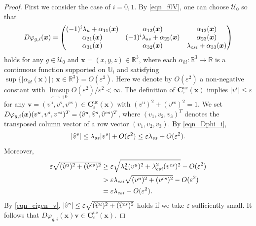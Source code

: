 \documentclass[10pt,a4paper]{amsart}
\def\bv{{\boldsymbol{v}}}
\def\bx{{\boldsymbol{x}}}
\begin{document}
\begin{proof}
First we consider the case of $i=0,1$.
By \eqref{eqn_f0V}, one can choose $\mathcal{U}_0$ so that 
\begin{equation}\label{eqn_Dphi_i}
D\varphi_{g,i}(\bx)=
\begin{pmatrix} (-1)^i\lambda_{\rm u}+\alpha_{11}(\bx)& \alpha_{12}(\bx)& \alpha_{13}(\bx)\\
\alpha_{21}(\bx)&(-1)^i \lambda_{\rm ss}+\alpha_{22}(\bx)& \alpha_{23}(\bx)\\
\alpha_{31}(\bx)& \alpha_{32}(\bx) &\lambda_{{\rm cs}i}+\alpha_{33}(\bx)
\end{pmatrix}
\end{equation}
holds for any $g\in\mathcal{U}_0$ and $\bx=(x,y,z)\in \mathbb{R}^3$,  
where each $\alpha_{kl}:\mathbb{R}^3\longrightarrow \mathbb{R}$ is a continuous function supported on $\mathbb{U}_i$ and satisfying  
$\sup\bigl\{|\alpha_{kl}(\bx)|\, ;\, \bx \in \mathbb{R}^3\bigr\}=O(\varepsilon^2)$.
Here we denote by $O(\varepsilon^2)$ a non-negative constant with $\limsup\limits_{\varepsilon\to +0}
O(\varepsilon^2)/\varepsilon^2<\infty$.
The definition of $\boldsymbol{C}_{\varepsilon}^{\mathrm{uc}}(\boldsymbol{x})$ 
implies $|v^{\mathrm{s}}|\leq \varepsilon$ for any $\bv=(v^{\mathrm{u}},v^{\mathrm{s}},v^{\mathrm{cs}})\in 
\boldsymbol{C}_{\varepsilon}^{\mathrm{uc}}(\boldsymbol{x})$ with 
$(v^{\mathrm{u}})^2+(v^{\mathrm{cs}})^2=1$.
We set $D\varphi_{g,i}(\bx)(v^{\rm u},v^{\rm s},v^{\rm cs})^T
=(\widehat{v}^{\rm u},\widehat{v}^{\rm s},\widehat{v}^{\rm cs})^T$, 
where $(v_1,v_2,v_3)^T$ denotes the transposed column vector of a row vector $(v_1,v_2,v_3)$.
By \eqref{eqn_Dphi_i}, 
\[
|\widehat{v}^{\rm s}|\leq \lambda_{\rm ss}|v^{\rm s}|+O(\varepsilon^2)
\leq \varepsilon\lambda_{\rm ss}+O(\varepsilon^2).
\]
Moreover, 
\begin{align*}
\varepsilon\sqrt{(\widehat{v}^{\rm u})^2+(\widehat{v}^{\rm cs})^2}
&\geq 
\varepsilon\sqrt{\lambda_{\rm u}^2(v^{\rm u})^2+\lambda_{{\rm cs}i}^2(v^{\rm cs})^2}-O(\varepsilon^2)\\
&>\varepsilon\lambda_{{\rm cs}i}\sqrt{(v^{\rm u})^2+(v^{\rm cs})^2}-O(\varepsilon^2)\\
&
=\varepsilon\lambda_{{\rm cs}i}-O(\varepsilon^2).
\end{align*}
By \eqref{eqn_eigen_v},   
$|\widehat{v}^{\rm s}|\leq \varepsilon\sqrt{(\widehat{v}^{\rm u})^2+(\widehat{v}^{\rm cs})^2}$ holds 
if we take $\varepsilon$ sufficiently small.
It follows that $D\varphi_{g,i}(\bx)\bv\in \boldsymbol{C}_{\varepsilon}^{\mathrm{uc}}(\boldsymbol{x})$.





\end{proof}
\end{document}
